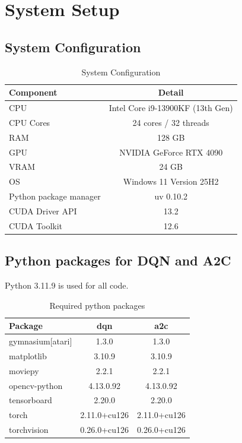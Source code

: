 \chapter {System Setup}

\section{System Configuration}
\begin{table}[H]
	\centering
	\caption{System Configuration}
	\label{tab:system-configuration}
	\begin{tabular}{|l|c|}
		\hline
		\textbf{Component} & \textbf{Detail} \\
		\hline
		CPU & Intel Core i9-13900KF (13th Gen) \\
		\hline
		CPU Cores & 24 cores / 32 threads \\
		\hline
		RAM & 128 GB \\
		\hline
		GPU & NVIDIA GeForce RTX 4090 \\
		\hline
		VRAM & 24 GB \\
		\hline
		OS & Windows 11 Version 25H2 \\
		\hline
		Python package manager & uv 0.10.2 \\
		\hline
		CUDA Driver API & 13.2 \\
		\hline
		CUDA Toolkit & 12.6 \\
		\hline
	\end{tabular}
\end{table}

\section{Python packages for DQN and A2C}
Python 3.11.9 is used for all code.

\begin{table}[H]
	\centering
	\caption{Required python packages}
	\label{tab:python-packages}
	\begin{tabular}{|l|c|c|}
		\hline
		\textbf{Package} & \textbf{\acrshort{dqn}} & \textbf{\acrshort{a2c}} \\
		\hline
		gymnasium{[}atari{]} & 1.3.0 & 1.3.0 \\
		\hline
		matplotlib & 3.10.9 & 3.10.9 \\
		\hline
		moviepy & 2.2.1 & 2.2.1 \\
		\hline
		opencv-python & 4.13.0.92 & 4.13.0.92 \\
		\hline
		tensorboard & 2.20.0 & 2.20.0 \\
		\hline
		torch & 2.11.0+cu126 & 2.11.0+cu126 \\
		\hline
		torchvision & 0.26.0+cu126 & 0.26.0+cu126 \\
		\hline
	\end{tabular}
\end{table}